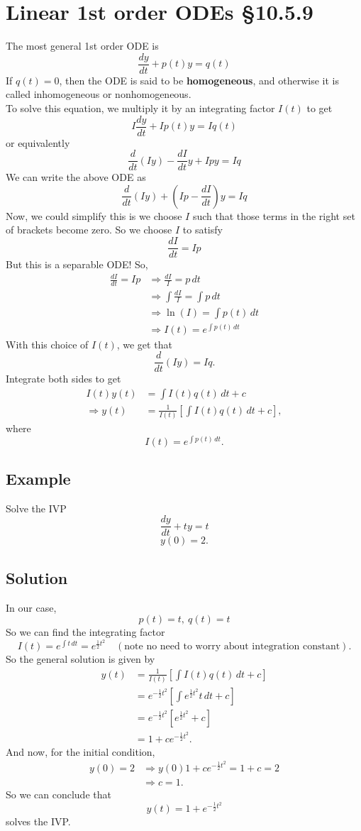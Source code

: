 \documentclass[11pt]{article}
\begin{document}
\section{Linear 1st order ODEs §10.5.9}
The most general 1st order ODE is
\[ \frac{dy}{dt} + p(t)y = q(t) \]
If $q(t) = 0$, then the ODE is said to be \textbf{homogeneous}, and otherwise it is called inhomogeneous or nonhomogeneous.\\
To solve this equation, we multiply it by an integrating factor $I(t)$ to get 
\[ I \frac{dy}{dt} + Ip(t)y = Iq(t) \]
or equivalently
\[ \frac{d}{dt}(Iy) - \frac{dI}{dt}y + Ipy = Iq \]
We can write the above ODE as
\[ \frac{d}{dt}(Iy) + \left( Ip - \frac{dI}{dt} \right)y = Iq \]
Now, we could simplify this is we choose $I$ such that those terms in the right set of brackets become zero. So we choose $I$ to satisfy
\[ \frac{dI}{dt} = Ip \]
But this is a separable ODE! So,
\begin{align*}
\frac{dI}{dt} = Ip &\Rightarrow \frac{dI}{I} = p\, dt \\
&\Rightarrow \int \frac{dI}{I} = \int p\, dt \\
&\Rightarrow \ln(I) = \int p(t)\, dt \\
&\Rightarrow I(t) = e^{\int p(t)\, dt}
\end{align*}
With this choice of $I(t)$, we get that 
\[ \frac{d}{dt}(Iy) = Iq. \]
Integrate both sides to get
\begin{align*}
I(t) y(t) &= \int I(t) q(t)\, dt + c \\
\Rightarrow y(t) &= \frac{1}{I(t)} \left[ \int I(t) q(t)\, dt + c \right],
\end{align*}
where
\[ I(t) = e^{\int p(t)\, dt}. \]

\subsection{Example}
Solve the IVP
\[ \frac{dy}{dt} + ty = t \]
\[ y(0) = 2.\]

\subsection{Solution}
In our case,
\[ p(t) = t,\ q(t) = t \]
So we can find the integrating factor
\[ I(t) = e^{\int t\, dt} = e^{\frac{1}{2} t^2} \quad (\text{note no need to worry about integration constant}). \]
So the general solution is given by
\begin{align*}
y(t) &= \frac{1}{I(t)} \left[ \int I(t) q(t)\, dt + c \right] \\
&= e^{-\frac{1}{2} t^2} \left[ \int e^{\frac{1}{2} t^2} t\, dt + c \right] \\
&= e^{-\frac{1}{2} t^2} \left[ e^{\frac{1}{2} t^2} + c \right] \\
&= 1 + c e^{-\frac{1}{2} t^2}.
\end{align*}
And now, for the initial condition,
\begin{align*}
y(0) = 2 &\Rightarrow y(0) 1 + c e^{-\frac{1}{2} t^2} = 1 + c = 2 \\
&\Rightarrow c = 1.
\end{align*}
So we can conclude that
\[ y(t) = 1 + e^{-\frac{1}{2} t^2} \]
solves the IVP.
\end{document}
